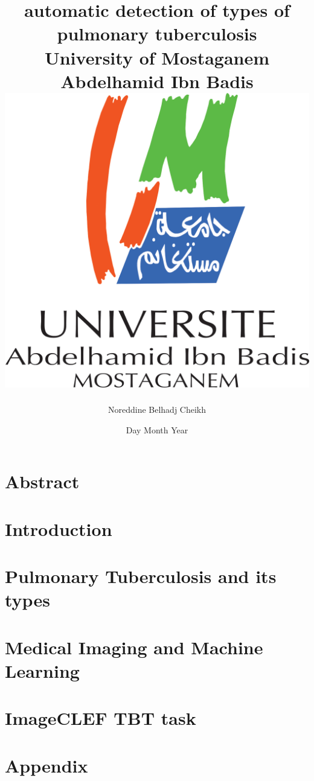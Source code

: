 \documentclass[12pt]{report}
\title{
{automatic detection of types of pulmonary tuberculosis}\\
{\large University of Mostaganem Abdelhamid Ibn Badis}\\
{\includegraphics{university.png}}
}
\author{Noreddine Belhadj Cheikh}
\date{Day Month Year}
\begin{document}
 \maketitle
\chapter*{Abstract}


\tableofcontents
\chapter*{Introduction}

\chapter{Pulmonary Tuberculosis and its types}

\chapter{Medical Imaging and Machine Learning}

\chapter{ImageCLEF TBT task}

\newpage
\appendix
\chapter{Appendix}

\printacronyms[include-classes=abbrev,name=Abbreviations]
\newpage
 

\end{document}
